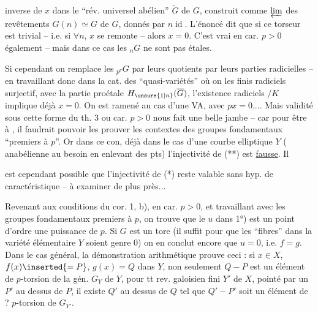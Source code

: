inverse de $x$ dans le ``rév. universel abélien'' $\widetilde G$ de $G$, construit comme $\varprojlim$ des revêtements $G(n)\simeq G$ de $G$, donnés par $n\operatorname{id}$. L'énoncé dit que si ce torseur est trivial -- i.e. si $\forall n$, $x$ se remonte -- alors $x=0$. C'est vrai en car. $p>0$ également -- mais dans ce cas les ${}_nG$ ne sont pas étales.


Si cependant on remplace les ${}_{p^\nu}G$ par leurs quotients par leurs parties radicielles -- en travaillant donc dans la cat. des ``quasi-variétés'' où on   les   finis radiciels surjectif,   avec la partie proétale  $H_{\unsure{1|n}}(\overline G)$,  l'existence   radiciels $/K$ implique déjà $x=0$.  On est ramené au cas d'une VA, avec $px=0$.... Mais  validité sous cette forme du th. 3 ou  car. $p>0$ nous fait une belle jambe -- car pour être à , il faudrait pouvoir les prouver   les contextes des groupes fondamentaux ``premiers à $p$''. Or dans ce con, déjà dans le cas d'une courbe elliptique $Y$ (  anabélienne au besoin en enlevant des pts) l'injectivité de (**) est \uline{fausse}. Il


est cependant possible que l'injectivité de (*) reste valable sans hyp. de caractéristique -- à examiner de plus près...

Revenant aux conditions du cor. 1, b), en car. $p>0$, et travaillant avec les groupes fondamentaux premiers à $p$, on trouve que le $u$ dans 1°) est un point  d'ordre une puissance de $p$. Si $G$ est un tore (il suffit pour  que les ``fibres'' dans la variété élémentaire $Y$ soient  genre 0) on en conclut encore que $u=0$, i.e. $f=g$. Dans le cas général, la démonstration arithmétique prouve  ceci : si $x\in X$,   $f(x)\inserted{=P}$, $g(x)=Q$ dans $Y$, non seulement $Q-P$ est un élément de $p$-torsion de la  gén. $G_Y$ de $Y$, pour tt rev.  galoisien fini $Y'$ de $X$,  pointé par un $P'$ au dessus de $P$, il existe $Q'$ au dessus de $Q$ tel que $Q'-P'$ soit un élément de ? $p$-torsion de $G_{Y'}$.


